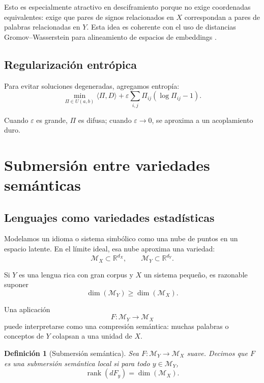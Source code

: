 \documentclass[11pt,a4paper]{article}
\newtheorem{definition}[theorem]{Definición}
\DeclareMathOperator{\rank}{rank}
\newcommand{\R}{\mathbb{R}}
\newcommand{\1}{\mathbf{1}}
\newcommand{\MX}{\mathcal{M}_X}
\newcommand{\MY}{\mathcal{M}_Y}
\numberwithin{equation}{section}
\begin{document}
Esto es especialmente atractivo en desciframiento porque no exige coordenadas equivalentes: exige que pares de signos relacionados en \(X\) correspondan a pares de palabras relacionadas en \(Y\). Esta idea es coherente con el uso de distancias Gromov--Wasserstein para alineamiento de espacios de embeddings \cite{alvarezmelis2018gw}.

\subsection{Regularización entrópica}

Para evitar soluciones degeneradas, agregamos entropía:
\begin{equation}
    \min_{\Pi\in U(a,b)}
    \langle \Pi,D\rangle
    +
    \varepsilon
    \sum_{i,j}\Pi_{ij}(\log \Pi_{ij}-1).
\end{equation}

Cuando \(\varepsilon\) es grande, \(\Pi\) es difusa; cuando \(\varepsilon\to 0\), se aproxima a un acoplamiento duro.

\section{Submersión entre variedades semánticas}

\subsection{Lenguajes como variedades estadísticas}

Modelamos un idioma o sistema simbólico como una nube de puntos en un espacio latente. En el límite ideal, esa nube aproxima una variedad:
\[
    \MX\subset\R^{d_X},
    \qquad
    \MY\subset\R^{d_Y}.
\]

Si \(Y\) es una lengua rica con gran corpus y \(X\) un sistema pequeño, es razonable suponer
\[
    \dim(\MY)\geq \dim(\MX).
\]

Una aplicación
\[
    F:\MY\to\MX
\]
puede interpretarse como una compresión semántica: muchas palabras o conceptos de \(Y\) colapsan a una unidad de \(X\).

\begin{definition}[Submersión semántica]
Sea \(F:\MY\to\MX\) suave. Decimos que \(F\) es una submersión semántica local si para todo \(y\in\MY\),
\[
    \rank(dF_y)=\dim(\MX).
\]
\end{definition}
\end{document}
